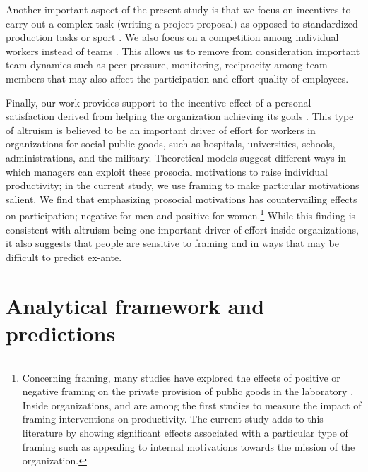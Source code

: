 \documentclass[12pt, titlepage]{article}
\begin{document}
Another important aspect of the present study is that we focus on
incentives to carry out a complex task (writing a project proposal) as
opposed to standardized production tasks \citep{knoeber1994testing} or
sport \citep{ehrenberg1990tournaments}. We also focus on a competition
among individual workers instead of teams
\citep[e.g.,][\citet{hamilton2003team} and more recently
\citet{gibbs2014field}]{erev1993constructive}. This allows us to remove
from consideration important team dynamics such as peer pressure,
monitoring, reciprocity among team members that may also affect the
participation and effort quality of employees.

Finally, our work provides support to the incentive effect of a personal
satisfaction derived from helping the organization achieving its goals
\citep{akerlof2005identity, besley2005competition, delfgaauw2005dedicated, delfgaauw2008incentives, prendergast2007motivation}.
This type of altruism is believed to be an important driver of effort
for workers in organizations for social public goods, such as hospitals,
universities, schools, administrations, and the military. Theoretical
models suggest different ways in which managers can exploit these
prosocial motivations to raise individual productivity; in the current
study, we use framing to make particular motivations salient. We find
that emphasizing prosocial motivations has countervailing effects on
participation; negative for men and positive for women.\footnote{Concerning
  framing, many studies have explored the effects of positive or
  negative framing on the private provision of public goods in the
  laboratory \citep{andreoni1995warm}. Inside organizations,
  \citet{hossain2012behavioralist} and \citet{hong2015framing} are among
  the first studies to measure the impact of framing interventions on
  productivity. The current study adds to this literature by showing
  significant effects associated with a particular type of framing such
  as appealing to internal motivations towards the mission of the
  organization.} While this finding is consistent with altruism being
one important driver of effort inside organizations, it also suggests
that people are sensitive to framing and in ways that may be difficult
to predict ex-ante.

\section{Analytical framework and
predictions}\label{analytical-framework-and-predictions}
\end{document}
